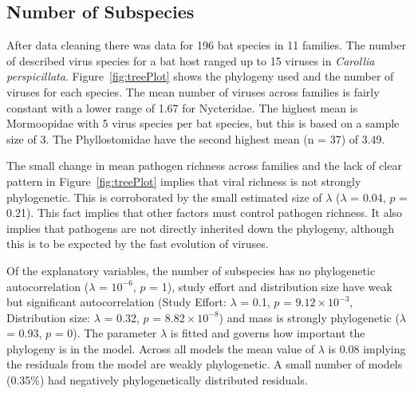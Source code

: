 \subsection{Number of Subspecies}

After data cleaning there was data for 196 bat species in 11 families.
The number of described virus species for a bat host ranged up to 15 viruses in \emph{Carollia perspicillata}.
Figure~\ref{fig:treePlot} shows the phylogeny used and the number of viruses for each species.
The mean number of viruses across families is fairly constant with a lower range of 1.67 for Nycteridae.
The highest mean is Mormoopidae with 5 virus species per bat species, but this is based on a sample size of 3.
The Phyllostomidae have the second highest mean (n = 37) of 3.49.

The small change in mean pathogen richness across families and the lack of clear pattern in Figure~\ref{fig:treePlot} implies that viral richness is not strongly phylogenetic. 
This is corroborated by the small estimated size of $\lambda$ ($\lambda$ = 0.04, $p$ = 0.21).
This fact implies that other factors must control pathogen richness.
It also implies that pathogens are not directly inherited down the phylogeny, although this is to be expected by the fast evolution of viruses.

Of the explanatory variables, the number of subspecies has no phylogenetic autocorrelation ($\lambda$ = \ensuremath{10^{-6}}, $p$ = 1), study effort and distribution size have weak but significant autocorrelation (Study Effort: $\lambda$ = 0.1, $p$ = \ensuremath{9.12\times 10^{-3}}, Distribution size: $\lambda$ = 0.32, $p$ = \ensuremath{8.82\times 10^{-8}}) and mass is strongly phylogenetic ($\lambda$ = 0.93, $p$ = 0). 
The parameter $\lambda$ is fitted and governs how important the phylogeny is in the model.
Across all models the mean value of $\lambda$ is 0.08 implying the residuals from the model are weakly phylogenetic.
A small number of models (0.35\%)  had negatively phylogenetically distributed residuals.


